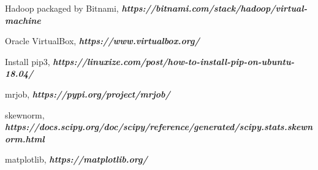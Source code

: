 \documentclass[11pt]{article}
\begin{document}
	\newpage
	\begin{thebibliography}{1}
		Hadoop packaged by Bitnami, \textit{\textbf{https://bitnami.com/stack/hadoop/virtual-machine}}
	
	
		Oracle VirtualBox, \textit{\textbf{https://www.virtualbox.org/}}
		
		Install pip3, \textit{\textbf{https://linuxize.com/post/how-to-install-pip-on-ubuntu-18.04/}}
		
		mrjob, \textit{\textbf{https://pypi.org/project/mrjob/}}
		
		skewnorm, \textit{\textbf{https://docs.scipy.org/doc/scipy/reference/generated/scipy.stats.skewnorm.html}}
		
		matplotlib, \textit{\textbf{https://matplotlib.org/}}
		
		
		
	\end{thebibliography}
	
	
\end{document}
